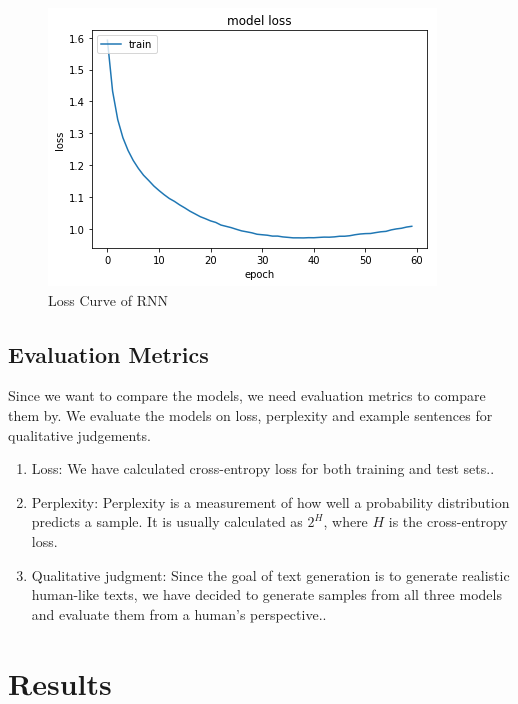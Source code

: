 \documentclass[11pt,a4paper]{article}
\begin{document}
\begin{figure}[h]
\begin{center}
\includegraphics[width=1.0\linewidth]{RNNLoss.png}
\end{center}
\caption{Loss Curve of RNN}
\end{figure}
   
\subsection{Evaluation Metrics}
Since we want to compare the models, we need evaluation metrics to compare them by. We evaluate the models on loss, perplexity and example sentences for qualitative judgements.

\begin{enumerate}
  \item Loss: We have calculated cross-entropy loss for both training and test sets.\cite{zhang2018generalized}.
  \item Perplexity: Perplexity is a measurement of how well a probability distribution predicts a sample. It is usually calculated as \(2^H\), where \(H\) is the cross-entropy loss\cite{horgan1995complexity}.
  \item Qualitative judgment: Since the goal of text generation is to generate realistic human-like texts, we have decided to generate samples from all three models and evaluate them from a human's perspective.\cite{bengio2015scheduled}.
\end{enumerate}

\section{Results}
\end{document}
